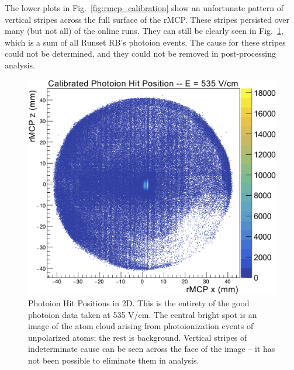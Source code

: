 The lower plots in Fig.~\ref{fig:rmcp_calibration} show an unfortunate pattern of vertical stripes across the full surface of the rMCP.  These stripes persisted over many (but not all) of the online runs.  They can still be clearly seen in Fig.~\ref{fig:photoionhits_2D}, which is a sum of all Runset RB's photoion events. The cause for these stripes could not be determined, and they could not be removed in post-processing analysis.  

\begin{figure}[h!tb]
	\centering
	\includegraphics[width=.999\linewidth]
	{Figures/rMCP_PI_2D_535.png}
	\caption[Photoion Hit Positions in 2D]{Photoion Hit Positions in 2D.  This is the entirety of the good photoion data taken at 535 V/cm.  The central bright spot is an image of the atom cloud arising from photoionization events of unpolarized atoms; the rest is background.  Vertical stripes of indeterminate cause can be seen across the face of the image -- it has not been possible to eliminate them in analysis. %
	}	
	\label{fig:photoionhits_2D}
\end{figure}



